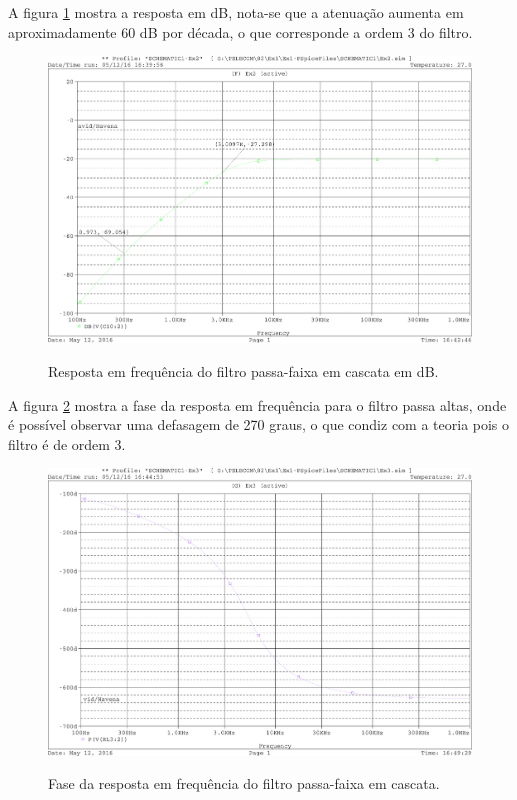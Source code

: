 A figura \ref{fig:resp_freq_db_3} mostra a resposta em dB, nota-se que a 
atenuação aumenta em aproximadamente 60 dB por década, o que corresponde a 
ordem 3 do filtro.

\begin{figure}[!h]
  \centering
  
  \includegraphics[scale=0.3]{Imagens/resp_freq_db_2}
  \label{fig:resp_freq_db_3}
  \caption{Resposta em frequência do filtro passa-faixa em cascata em dB.}
\end{figure}

A figura \ref{fig:resp_freq_phase_3} mostra a fase da resposta em frequência 
para o filtro passa altas, onde é possível observar uma defasagem de 270 graus, 
o que condiz com a teoria pois o filtro é de ordem 3.

\begin{figure}[!h]
  \centering
  
  \includegraphics[scale=0.3]{Imagens/resp_freq_phase_3}
  \label{fig:resp_freq_phase_3}
  \caption{Fase da resposta em frequência do filtro passa-faixa em cascata.}
\end{figure}

